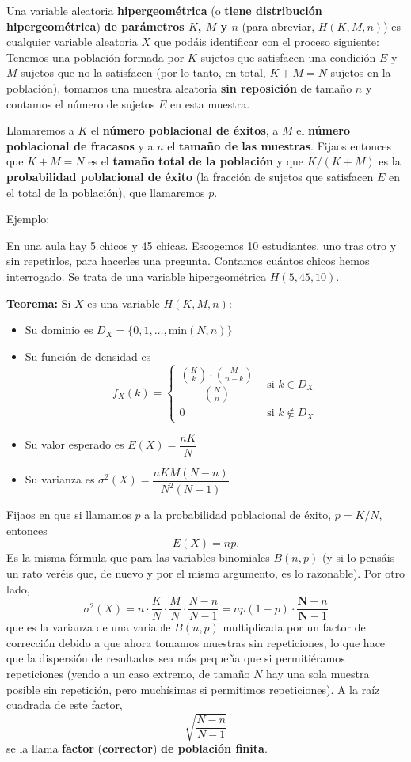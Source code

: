 \documentclass[
  spanish,
  letterpaper,
  DIV=11,
  numbers=noendperiod]{scrreprt}
\begin{document}
Una variable aleatoria \textbf{hipergeométrica} (o \textbf{tiene
distribución hipergeométrica}) \textbf{de parámetros \(K\), \(M\) y
\(n\)} (para abreviar, \(H(K,M,n)\)) es cualquier variable aleatoria
\(X\) que podáis identificar con el proceso siguiente: Tenemos una
población formada por \(K\) sujetos que satisfacen una condición \(E\) y
\(M\) sujetos que no la satisfacen (por lo tanto, en total, \(K+M=N\)
sujetos en la población), tomamos una muestra aleatoria \textbf{sin
reposición} de tamaño \(n\) y contamos el número de sujetos \(E\) en
esta muestra.

Llamaremos a \(K\) el \textbf{número poblacional de éxitos}, a \(M\) el
\textbf{número poblacional de fracasos} y a \(n\) el \textbf{tamaño de
las muestras}. Fijaos entonces que \(K+M=N\) es el \textbf{tamaño total
de la población} y que \(K/(K+M)\) es la \textbf{probabilidad
poblacional de éxito} (la fracción de sujetos que satisfacen \(E\) en el
total de la población), que llamaremos \(p\).

Ejemplo:

En una aula hay 5 chicos y 45 chicas. Escogemos 10 estudiantes, uno tras
otro y sin repetirlos, para hacerles una pregunta. Contamos cuántos
chicos hemos interrogado. Se trata de una variable hipergeométrica
\(H(5,45,10)\).

\textbf{Teorema:} Si \(X\) es una variable \(H(K,M,n)\):

\begin{itemize}
\item
  Su dominio es \(D_X=\{0,1,\ldots,\text{min}(N,n)\}\)
\item
  Su función de densidad es \[
  f_X(k)=\left\{\begin{array}{ll}
  \displaystyle\dfrac{\binom{K}{k}\cdot \binom{M}{n-k}}{\binom{N}{n}} & \text{ si $k\in D_X$}\\
  0 & \text{ si $k\notin D_X$}
  \end{array}\right.
  \]
\item
  Su valor esperado es \(E(X)=\dfrac{nK}{N}\)
\item
  Su varianza es \(\sigma^2(X)=\dfrac{nKM(N-n)}{N^2(N-1)}\)
\end{itemize}

Fijaos en que si llamamos \(p\) a la probabilidad poblacional de éxito,
\(p=K/N\), entonces \[
E(X)=np.
\] Es la misma fórmula que para las variables binomiales \(B(n,p)\) (y
si lo pensáis un rato veréis que, de nuevo y por el mismo argumento, es
lo razonable). Por otro lado, \[
\sigma^2(X)=n\cdot\dfrac{K}{N}\cdot\dfrac{M}{N}\cdot\frac{N-n}{N-1}=np(1-p)\cdot\dfrac{\mathbf{N}-n}{\mathbf{N}-1}
\] que es la varianza de una variable \(B(n,p)\) multiplicada por un
factor de corrección debido a que ahora tomamos muestras sin
repeticiones, lo que hace que la dispersión de resultados sea más
pequeña que si permitiéramos repeticiones (yendo a un caso extremo, de
tamaño \(N\) hay una sola muestra posible sin repetición, pero
muchísimas si permitimos repeticiones). A la raíz cuadrada de este
factor, \[
\sqrt{\dfrac{N-n}{N-1}}
\] se la llama \textbf{factor} (\textbf{corrector}) \textbf{de población
finita}.
\end{document}
